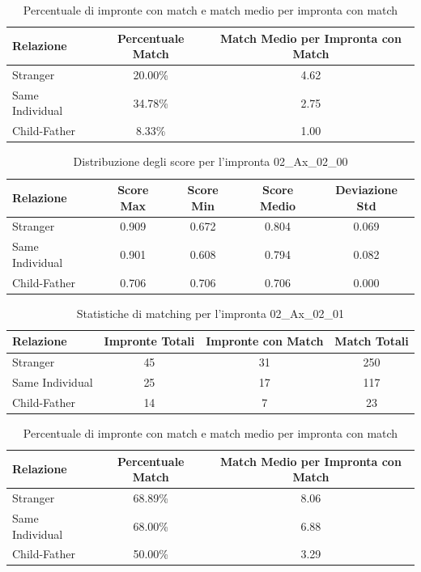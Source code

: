 \begin{table}[htbp]
\centering
\caption{Percentuale di impronte con match e match medio per impronta con match}
\label{tab:match_percentage_02_Ax_02_00}
\begin{tabular}{|l|c|c|}
\hline
\textbf{Relazione} & \textbf{Percentuale Match} & \textbf{Match Medio per Impronta con Match} \\
\hline
Stranger & 20.00\% & 4.62 \\
\hline
Same Individual & 34.78\% & 2.75 \\
\hline
Child-Father & 8.33\% & 1.00 \\
\hline
\end{tabular}
\end{table}


\begin{table}[htbp]
\centering
\caption{Distribuzione degli score per l'impronta 02\_Ax\_02\_00}
\label{tab:scores_02_Ax_02_00}
\begin{tabular}{|l|c|c|c|c|}
\hline
\textbf{Relazione} & \textbf{Score Max} & \textbf{Score Min} & \textbf{Score Medio} & \textbf{Deviazione Std} \\
\hline
Stranger & 0.909 & 0.672 & 0.804 & 0.069 \\
\hline
Same Individual & 0.901 & 0.608 & 0.794 & 0.082 \\
\hline
Child-Father & 0.706 & 0.706 & 0.706 & 0.000 \\
\hline
\end{tabular}
\end{table}


\begin{table}[htbp]
\centering
\caption{Statistiche di matching per l'impronta 02\_Ax\_02\_01}
\label{tab:results_02_Ax_02_01}
\begin{tabular}{|l|c|c|c|}
\hline
\textbf{Relazione} & \textbf{Impronte Totali} & \textbf{Impronte con Match} & \textbf{Match Totali} \\
\hline
Stranger & 45 & 31 & 250 \\
\hline
Same Individual & 25 & 17 & 117 \\
\hline
Child-Father & 14 & 7 & 23 \\
\hline
\end{tabular}
\end{table}


\begin{table}[htbp]
\centering
\caption{Percentuale di impronte con match e match medio per impronta con match}
\label{tab:match_percentage_02_Ax_02_01}
\begin{tabular}{|l|c|c|}
\hline
\textbf{Relazione} & \textbf{Percentuale Match} & \textbf{Match Medio per Impronta con Match} \\
\hline
Stranger & 68.89\% & 8.06 \\
\hline
Same Individual & 68.00\% & 6.88 \\
\hline
Child-Father & 50.00\% & 3.29 \\
\hline
\end{tabular}
\end{table}


